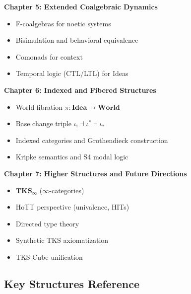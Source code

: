 \begin{remark}
\textbf{Chapter 5: Extended Coalgebraic Dynamics}
\begin{itemize}
  \item F-coalgebras for noetic systems
  \item Bisimulation and behavioral equivalence
  \item Comonads for context
  \item Temporal logic (CTL/LTL) for Ideas
\end{itemize}

\textbf{Chapter 6: Indexed and Fibered Structures}
\begin{itemize}
  \item World fibration $\pi : \mathbf{Idea} \to \mathbf{World}$
  \item Base change triple $\iota_! \dashv \iota^* \dashv \iota_*$
  \item Indexed categories and Grothendieck construction
  \item Kripke semantics and S4 modal logic
\end{itemize}

\textbf{Chapter 7: Higher Structures and Future Directions}
\begin{itemize}
  \item $\mathbf{TKS}_\infty$ ($\infty$-categories)
  \item HoTT perspective (univalence, HITs)
  \item Directed type theory
  \item Synthetic TKS axiomatization
  \item TKS Cube unification
\end{itemize}
\end{remark}

\subsection{Key Structures Reference}
\label{subsec:key-structures}

